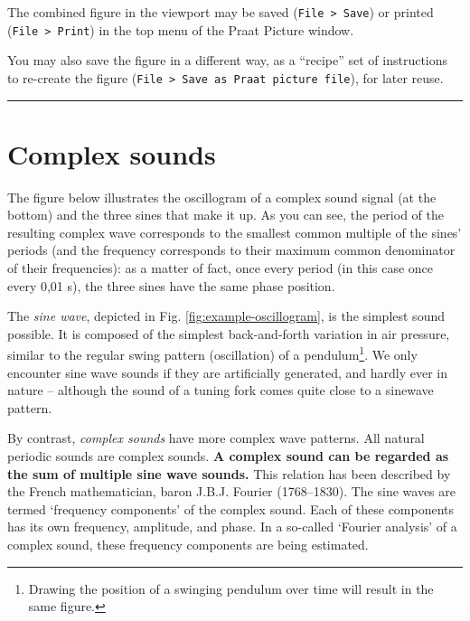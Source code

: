 \documentclass[
]{book}
\begin{document}
The combined figure in the viewport may be saved (\texttt{File\ \textgreater{}\ Save}) or printed (\texttt{File\ \textgreater{}\ Print}) in the top menu of the Praat Picture window.

You may also save the figure in a different way, as a ``recipe'' set of instructions to re-create the figure (\texttt{File\ \textgreater{}\ Save\ as\ Praat\ picture\ file}), for later reuse.

\begin{center}\rule{0.5\linewidth}{0.5pt}\end{center}

\section{Complex sounds}\label{complex-sounds}

The figure below illustrates the oscillogram of a complex sound signal (at the bottom) and the three sines that make it up. As you can see, the period of the resulting complex wave corresponds to the smallest common multiple of the sines' periods (and the frequency corresponds to their maximum common denominator of their frequencies): as a matter of fact, once every period (in this case once every 0,01 s), the three sines have the same phase position.

The \emph{sine wave}, depicted in Fig. \ref{fig:example-oscillogram}, is the simplest sound possible. It is composed of the simplest back-and-forth variation in air pressure, similar to the regular swing pattern (oscillation) of a pendulum\footnote{Drawing the position of a swinging pendulum over time will result in the same figure.}. We only encounter sine wave sounds if they are artificially generated, and hardly ever in nature -- although the sound of a tuning fork comes quite close to a sinewave pattern.

By contrast, \emph{complex sounds} have more complex wave patterns. All natural periodic sounds are complex sounds. \textbf{A complex sound can be regarded as the sum of multiple sine wave sounds.} This relation has been described by the French mathematician, baron J.B.J. Fourier (1768--1830). The sine waves are termed `frequency components' of the complex sound. Each of these components has its own frequency, amplitude, and phase. In a so-called `Fourier analysis' of a complex sound, these frequency components are being estimated.
\end{document}
